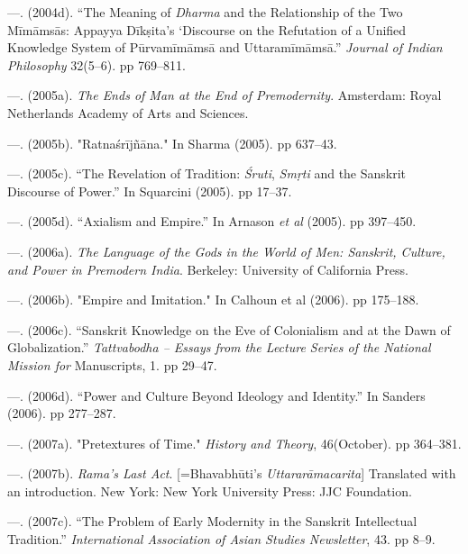  \item —. (2004d). “The Meaning of \textit{Dharma} and the Relationship of the Two Mīmāmsās: Appayya Dīkṣita’s ‘Discourse on the Refutation of a Unified Knowledge System of Pūrvamīmāmsā and Uttaramīmāmsā.” \textit{Journal of Indian Philosophy} 32(5–6). pp 769–811.

 \item —. (2005a).\textit{ The Ends of Man at the End of Premodernity}. Amsterdam: Royal Netherlands Academy of Arts and Sciences.

 \item —. (2005b). "Ratnaśrījñāna." In Sharma (2005). pp 637–43.

 \item —. (2005c). “The Revelation of Tradition: \textit{Śruti}, \textit{Smṛti} and the Sanskrit Discourse of Power.” In Squarcini (2005). pp 17–37.

 \item —. (2005d). “Axialism and Empire.” In Arnason \textit{et al} (2005). pp 397–450.

 \item —. (2006a).\textit{ The Language of the Gods in the World of Men: Sanskrit, Culture, and Power in Premodern India}. Berkeley: University of California Press.

 \item —. (2006b). "Empire and Imitation." In Calhoun et al (2006). pp 175–188.

 \item —. (2006c). “Sanskrit Knowledge on the Eve of Colonialism and at the Dawn of Globalization.” \textit{Tattvabodha – Essays from the Lecture Series of the National Mission for }Manuscripts, 1. pp 29–47.

 \item —. (2006d). “Power and Culture Beyond Ideology and Identity.” In Sanders (2006). pp 277–287.

 \item —. (2007a). "Pretextures of Time." \textit{History and Theory}, 46(October). pp 364–381.

 \item —. (2007b).\textit{ Rama’s Last Act}. [=Bhavabhūti’s \textit{Uttararāmacarita}] Translated with an introduction. New York: New York University Press: JJC Foundation.

 \item —. (2007c). “The Problem of Early Modernity in the Sanskrit Intellectual Tradition.” \textit{International Association of Asian Studies Newsletter}, 43. pp 8–9.

